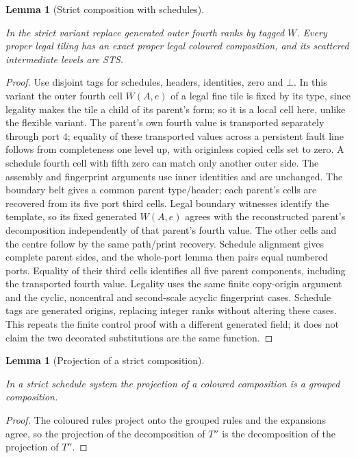 \documentclass[11pt,a4paper]{article}
\newtheorem{lemma}[definition]{Lemma}
\theoremstyle{remark}
\newcommand{\lean}[1]{}
\newcommand{\uses}[1]{}
\begin{document}
\begin{lemma}[Strict composition with schedules]\label{lem:schedule-compose}
\lean{Tilings.Alignment.strict_schedule_composition,Tilings.Planned.Strict.strict_opposing_macroside,Tilings.Planned.Strict.strict_compose_exists}
\uses{lem:whole-ports,lem:alignment-tuple,lem:comp/assembly,lem:comp/boundary-header,lem:comp/signals,lem:comp/cyclic-legal,lem:comp/noncentral-legal,lem:comp/acyclic-legal}
In the strict variant replace generated outer fourth ranks by tagged $W$.
Every proper legal tiling has an exact proper legal coloured composition,
and its scattered intermediate levels are STS.
\end{lemma}
\begin{proof}
Use disjoint tags for schedules, headers, identities, zero and $\bot$.
In this variant the outer fourth cell $W(A,e)$ of a legal fine tile is
fixed by its type, since legality makes the tile a child of its parent's
form; so it is a local cell here, unlike the flexible variant. The parent's
own fourth value is transported separately through port $4$; equality of
these transported values across a persistent fault line follows from
completeness one level up, with originless copied cells set to zero.
A schedule fourth cell with fifth zero can match only another outer side.
The assembly and fingerprint arguments use inner identities and are unchanged.
The boundary belt gives a common parent type/header; each parent's cells
are recovered from its five port third cells. Legal boundary witnesses
identify the template, so its fixed generated $W(A,e)$ agrees with the
reconstructed parent's decomposition independently of that parent's fourth
value. The other cells and the centre follow by the same path/print recovery.
Schedule alignment gives complete parent sides, and the whole-port lemma
then pairs equal numbered ports. Equality of their third cells identifies
all five parent components, including the transported fourth value.
Legality uses the same finite copy-origin argument and the cyclic,
noncentral and second-scale acyclic fingerprint cases. Schedule tags are
generated origins, replacing integer ranks without altering these cases.
This repeats the finite control proof with a different generated field;
it does not claim the two decorated substitutions are the same function.
\end{proof}

\begin{lemma}[Projection of a strict composition]\label{lem:strict-projection}
\lean{Tilings.Alignment.StrictScheduleSystem.isComposition_project}
\uses{lem:schedule-compose}
In a strict schedule system the projection of a coloured composition is a
grouped composition.
\end{lemma}
\begin{proof}
The coloured rules project onto the grouped rules and the expansions agree,
so the projection of the decomposition of $T''$ is the decomposition of the
projection of $T''$.
\end{proof}
\end{document}
